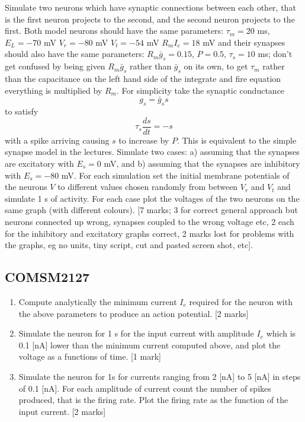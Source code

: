 \documentclass[12pt]{article}
\begin{document}
Simulate two neurons which have synaptic connections between
  each other, that is the first neuron projects to the second, and the
  second neuron projects to the first. Both model neurons should have
  the same parameters: $\tau_m = 20$ ms, $E_L = -70$ mV $V_r = -80$ mV
  $V_t = -54$ mV $R_mI_e = 18$ mV and their synapses should also have
  the same parameters: $R_m \bar{g}_s = 0.15$, $P = 0.5$, $\tau_s= 10$
  ms; don't get confused by being given $R_m\bar{g}_s$ rather than
  $\bar{g}_s$ on its own, to get $\tau_m$ rather than the capacitance
  on the left hand side of the integrate and fire equation everything
  is multiplied by $R_m$. For simplicity take the synaptic conductance
\begin{equation}
g_s=\bar{g}_s s
\end{equation}
to satisfy
\begin{equation}
\tau_s\frac{ds}{dt}=-s
\end{equation}
with a spike arriving causing $s$ to increase by $P$. This is
equivalent to the simple synapse model in the lectures. Simulate two
cases: a) assuming that the synapses are excitatory with $E_s = 0$ mV,
and b) assuming that the synapses are inhibitory with $E_s = -80$
mV. For each simulation set the initial membrane potentials of the
neurons $V$ to different values chosen randomly from between $V_r$ and
$V_t$ and simulate 1 s of activity. For each case plot the voltages of
the two neurons on the same graph (with different colours). [7 marks;
  3 for correct general approach but neurons connected up wrong,
  synapses coupled to the wrong voltage etc, 2 each for the inhibitory
  and excitatory graphs correct, 2 marks lost for problems with the
  graphs, eg no units, tiny script, cut and pasted screen shot, etc].

\subsection*{COMSM2127}

\begin{enumerate}

\item Compute analytically the minimum current $I_e$ required for the
  neuron with the above parameters to produce an action
  potential. [2 marks]

\item Simulate the neuron for 1 s for the input current with amplitude
  $I_e$ which is 0.1 [nA] lower than the minimum current computed
  above, and plot the voltage as a functions of time. [1 mark]

\item Simulate the neuron for 1s for currents ranging from 2 [nA] to 5
  [nA] in steps of 0.1 [nA]. For each amplitude of current count the
  number of spikes produced, that is the firing rate. Plot the firing
  rate as the function of the input current. [2 marks]

\end{enumerate}
\end{document}
